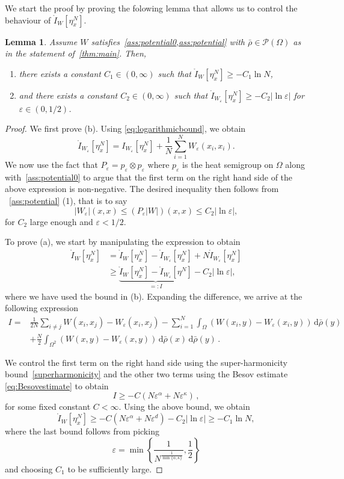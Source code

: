 \documentclass[a4paper,10pt,twoside]{amsart}
\newcommand{\dx}[1]{\,\mathrm{d}#1}  %
\newtheorem{lemma}[theorem]{Lemma}
\theoremstyle{remark}
\theoremstyle{definition}
\numberwithin{equation}{section}
\newcommand{\eps}{\varepsilon}
\newcommand{\cP}{\mathcal{P}}
\newcommand{\0}{{\bf 0}}
\newcommand{\+}{\hspace{-.5ex}+\hspace{-.5ex}}
\begin{document}
We start the proof by proving the folowing lemma that allows us to control the behaviour of $\mathring{I}_W[\eta^N_x]$. 
\begin{lemma}
Assume $W $ satisfies~\cref{ass:potential0,ass:potential} with $\bar\rho \in \cP(\Omega)$ as in the statement of~\cref{thm:main}. Then, 
\begin{enumerate}
\item[(a)] there exists a constant $C_1\in (0,\infty)$ such that $ \mathring{I}_W[\eta^N_x]\geq -C_1\ln N$,
\item[(b)] and there exists a constant $C_2\in (0,\infty)$ such that $\mathring{I}_{W_\eps}[\eta^N_x]\geq -C_2|\ln \eps|$ for $\eps \in (0,1/2)$.
\end{enumerate}
\label{lem:coulombapriori}
\end{lemma}
\begin{proof}
  We first prove (b).  Using \eqref{eq:logarithmicbound}, we obtain
$$
\mathring{I}_{W_\eps}[\eta^N_x]= I_{W_\eps}[\eta^N_x]+\frac{1}{N}\sum_{i=1}^N W_\eps(x_i,x_i).
$$
We now use the fact that $P_\eps=p_\eps \otimes p_\eps$ where $p_\eps$ is the heat semigroup on $\Omega$ along with~\cref{ass:potential0} to argue that the first term on the right hand side of the above expression is non-negative.  The desired inequality then follows from ~\cref{ass:potential} (1), that is to say
$$
|W_\eps|(x,x)\le (P_\eps |W|)(x,x)\le C_2|\ln\eps|,
$$
for $C_2$ large enough and $\eps<1/2$.
  
To prove (a), we start by manipulating the expression to obtain
\begin{align}
    \mathring{I}_W[\eta^N_x]&=\mathring{I}_W[\eta^N_x]- \mathring{I}_{W_\eps} [\eta^N_x]+N\mathring{I}_{W_\eps}[\eta^N_x]\\
    &\ge \underbrace{\mathring{I}_W[\eta^N_x]- \mathring{I}_{W_\eps}[\eta^N]}_{=:I}-C_2|\ln\eps|,
\end{align}
where we have used the bound in (b). Expanding the difference, we arrive at the following expression
\begin{align}
    I=&\frac{1}{2N} \sum_{i\ne j} W(x_i,x_j)-W_\eps(x_i,x_j)-\sum_{i=1}^N\int_\Omega \left(W(x_i,y)-W_\eps(x_i,y) \right)\dx \bar\rho(y)\\
    &+\frac{N}{2}\int_{\Omega^2} \left(W(x,y)-W_\eps(x,y)\right)\dx\bar\rho(x)\dx\bar\rho(y) \, .
\end{align}

We control the first term on the right hand side using the super-harmonicity bound~\eqref{superharmonicity} and the other two terms using the Besov estimate \eqref{eq:Besovestimate} to obtain
$$
I\ge -C(N\eps^\alpha+N\eps^\kappa) \, ,
$$
for some fixed constant $C<\infty$. Using the above bound, we obtain
$$
\mathring{I}_W[\eta^N_x]\ge -C(N\eps^\alpha+N\eps^d)-C_2|\ln\eps|\ge -C_1\ln N,
$$
where the last bound follows from picking
$$
\eps=\min\left\{\frac{1}{N^{\frac{1}{\min\{\alpha,\kappa\}}}},\frac12 \right\}
$$
and choosing $C_1$ to be sufficiently large.
\end{proof}
\end{document}
